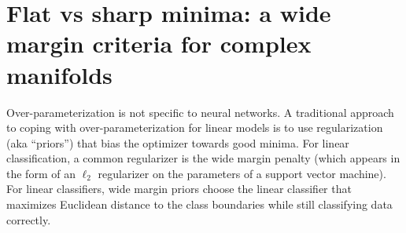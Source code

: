 \documentclass{article}
\begin{document}
%
%
%

    \section{Flat vs sharp minima: a wide margin criteria for complex manifolds}
Over-parameterization is not specific to neural networks.   A traditional approach to coping with over-parameterization for linear models is to use regularization (aka ``priors'') that bias the optimizer towards good minima.  %
For linear classification, a common regularizer is the wide margin penalty (which appears in the form of an $\ell_2$ regularizer on the parameters of a support vector machine).  For linear classifiers, wide margin priors choose the linear classifier that maximizes Euclidean distance to the class boundaries while still classifying data correctly.
\end{document}
